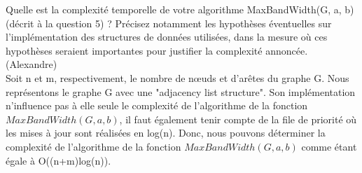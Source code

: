 Quelle est la complexité temporelle de votre algorithme MaxBandWidth(G, a, b)
(décrit à la question 5) ? Précisez notamment les hypothèses éventuelles sur l’implémentation
des structures de données utilisées, dans la mesure où ces hypothèses
seraient importantes pour justifier la complexité annoncée.%
(Alexandre)\\

Soit n et m, respectivement, le nombre de nœuds et d'arêtes du graphe G. Nous représentons le graphe G avec une "adjacency list structure". Son implémentation n'influence pas à elle seule le complexité de l'algorithme de la fonction $MaxBandWidth(G, a, b)$, il faut également tenir compte de la file de priorité où les mises à jour sont réalisées en log(n). Donc, nous pouvons déterminer la complexité de l'algorithme de la fonction $MaxBandWidth(G, a, b)$ comme étant égale à O((n+m)log(n)).
